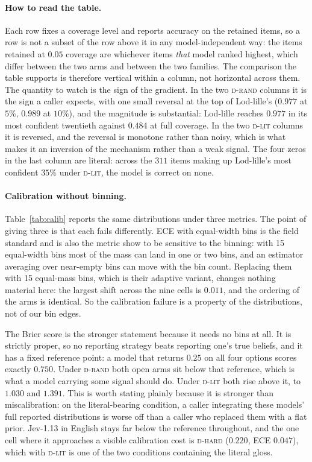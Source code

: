 \documentclass[11pt]{article}
\newcommand{\Drand}{\textsc{d-rand}}
\newcommand{\Dlit}{\textsc{d-lit}}
\newcommand{\Dhard}{\textsc{d-hard}}
\begin{document}
\paragraph{How to read the table.} Each row fixes a coverage level and reports
accuracy on the retained items, so a row is not a subset of the row above it in
any model-independent way: the items retained at $0.05$ coverage are whichever
items \emph{that} model ranked highest, which differ between the two arms and
between the two families. The comparison the table supports is therefore vertical
within a column, not horizontal across them. The quantity to watch is the sign of
the gradient. In the two \Drand{} columns it is the sign a caller expects, with
one small reversal at the top of Lod-lille's ($0.977$ at $5\%$, $0.989$ at $10\%$),
and the magnitude is substantial: Lod-lille reaches $0.977$ in its most confident
twentieth against $0.484$ at full coverage. In the two \Dlit{} columns it is
reversed, and the reversal is monotone rather than noisy, which is what makes it
an inversion of the mechanism rather than a weak signal. The four zeros in the
last column are literal: across the $311$ items making up Lod-lille's most
confident $35\%$ under \Dlit{}, the model is correct on none.

\paragraph{Calibration without binning.} Table~\ref{tab:calib} reports the same
distributions under three metrics. The point of giving three is that each fails
differently. ECE with equal-width bins is the field standard and is also the
metric \citet{nixon2019measuring} show to be sensitive to the binning: with 15
equal-width bins most of the mass can land in one or two bins, and an estimator
averaging over near-empty bins can move with the bin count. Replacing them with
15 equal-mass bins, which is their adaptive variant, changes nothing material
here: the largest shift across the nine cells is $0.011$, and the ordering of the
arms is identical. So the calibration failure is a property of the
distributions, not of our bin edges.

The Brier score is the stronger statement because it needs no bins at all. It is
strictly proper, so no reporting strategy beats reporting one's true beliefs, and
it has a fixed reference point: a model that returns $0.25$ on all four options
scores exactly $0.750$. Under \Drand{} both open arms sit below that reference,
which is what a model carrying some signal should do. Under \Dlit{} both rise
above it, to $1.030$ and $1.391$. This is worth stating plainly because it is
stronger than miscalibration: on the literal-bearing condition, a caller
integrating these models' full reported distributions is worse off than a caller
who replaced them with a flat prior. Jev-1.13 in English stays far below the
reference throughout, and the one cell where it approaches a visible calibration
cost is \Dhard{} ($0.220$, ECE $0.047$), which with \Dlit{} is one of the two
conditions containing the literal gloss.
\end{document}

